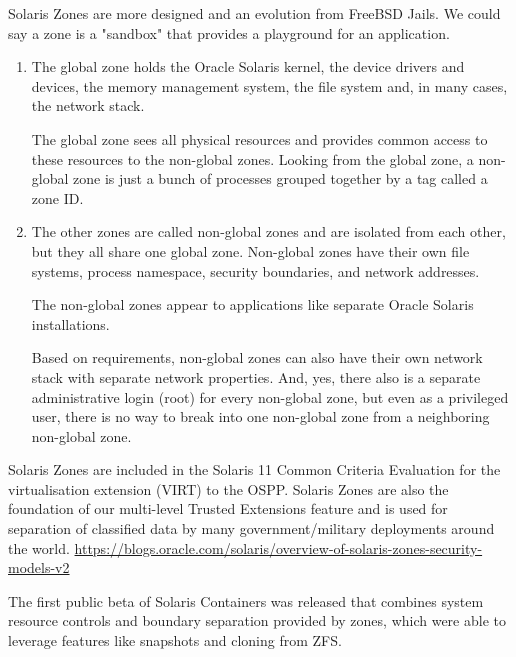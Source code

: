 Solaris Zones are more designed and an evolution from FreeBSD Jails.
We could say a zone is a "sandbox" that provides a playground for an
application.
\begin{enumerate}
  
  \item The global zone holds the Oracle Solaris kernel, the device drivers and
  devices, the memory management system, the file system and, in many cases, the
  network stack.
  
  The global zone sees all physical resources and provides common access to
  these resources to the non-global zones.
  Looking from the global zone, a non-global zone is just a bunch of processes
  grouped together by a tag called a zone ID.
  
  
  \item The other zones are called non-global zones and are isolated from each
  other, but they all share one global zone. Non-global zones have their own
  file systems, process namespace, security boundaries, and network addresses.
  
  The non-global zones appear to applications like separate Oracle Solaris
  installations.
  
   Based on requirements, non-global zones can also have their own network stack
   with separate network properties. And, yes, there also is a separate
   administrative login (root) for every non-global zone, but even as a
   privileged user, there is no way to break into one non-global zone from a
   neighboring non-global zone. 
  
\end{enumerate}

Solaris Zones are included in the Solaris 11 Common Criteria Evaluation for the
virtualisation extension (VIRT) to the OSPP. Solaris Zones are also the
foundation of our multi-level Trusted Extensions feature and is used for
separation of classified data by many government/military deployments around the
world. \url{https://blogs.oracle.com/solaris/overview-of-solaris-zones-security-models-v2}


The first public beta of Solaris Containers was released that combines system
resource controls and boundary separation provided by zones, which were able to
leverage features like snapshots and cloning from ZFS.



